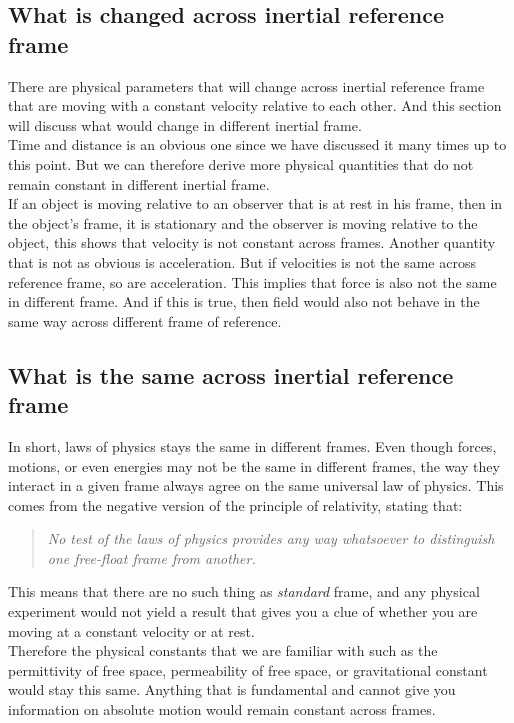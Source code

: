 \documentclass[12pt]{book}
\begin{document}
\subsection{What is changed across inertial reference frame}
There are physical parameters that will change across inertial reference frame that are moving with a constant velocity relative to each other. And this section will discuss what would change in different inertial frame.\\
\newline
Time and distance is an obvious one since we have discussed it many times up to this point. But we can therefore derive more physical quantities that do not remain constant in different inertial frame. \\
\newline
If an object is moving relative to an observer that is at rest in his frame, then in the object's frame, it is stationary and the observer is moving relative to the object, this shows that velocity is not constant across frames. Another quantity that is not as obvious is acceleration. But if velocities is not the same across reference frame, so are acceleration. This implies that force is also not the same in different frame. And if this is true, then field would also not behave in the same way across different frame of reference. 
\subsection{What is the same across inertial reference frame}
In short, laws of physics stays the same in different frames. Even though forces, motions, or even energies may not be the same in different frames, the way they interact in a given frame always agree on the same universal law of physics. This comes from the negative version of the principle of relativity, stating that:
\begin{quote}
    \textit{No test of the laws of physics provides any way whatsoever to distinguish one free-float frame from another.}
\end{quote}
This means that there are no such thing as \textit{standard} frame, and any physical experiment would not yield a result that gives you a clue of whether you are moving at a constant velocity or at rest. \\
\newline
Therefore the physical constants that we are familiar with such as the permittivity of free space, permeability of free space, or gravitational constant would stay this same. Anything that is fundamental and cannot give you information on absolute motion would remain constant across frames. 
\end{document}
